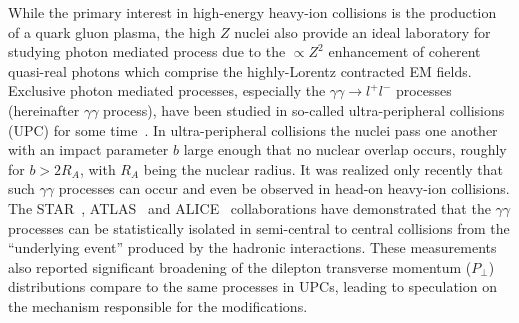 \documentclass[twocolumn,epjc3]{svjour3}\sloppy
\begin{document}
While the primary interest in high-energy heavy-ion collisions is the production of a quark gluon plasma, the high $Z$ nuclei also provide an ideal laboratory for studying photon mediated process due to the $\propto Z^2$ enhancement of coherent quasi-real photons which comprise the highly-Lorentz contracted EM fields. 
Exclusive photon mediated processes, especially the $\gamma\gamma \rightarrow l^+l^-$ processes (hereinafter $\gamma\gamma$ process), have been studied in so-called ultra-peripheral collisions (UPC) for some time~\cite{abbasCharmoniumPairPhotoproduction2013a,bertulaniElectromagneticProcessesRelativistic1988,baurElectronPositronPairProduction2007a,starcollaborationProductionEnsuremathPairs2004}. In ultra-peripheral collisions the nuclei pass one another with an impact parameter $b$ large enough that no nuclear overlap occurs, roughly for $b>2R_A$, with $R_A$ being the nuclear radius. 
It was realized only recently that such $\gamma\gamma$ processes can occur and even be observed in head-on heavy-ion collisions. The STAR~\cite{starcollaborationLowEnsuremathPair2018b}, ATLAS~\cite{atlascollaborationObservationCentralityDependentAcoplanarity2018a} and ALICE~\cite{lehnerDielectronProductionLow2019a} collaborations have demonstrated that the $\gamma\gamma$ processes can be statistically isolated in semi-central to central collisions from the ``underlying event'' produced by the hadronic interactions. 
These measurements also reported significant broadening of the dilepton transverse momentum ($P_\perp$) distributions compare to the same processes in UPCs, leading to speculation on the mechanism responsible for the modifications. 
\end{document}
